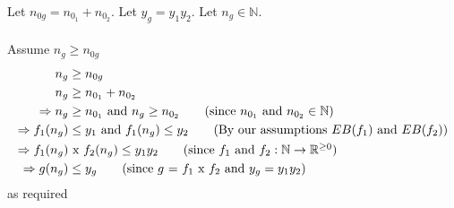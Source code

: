 \documentclass[20pt]{article}
\begin{document}
\begin{enumerate}
        Let $n_{0g} =  n_{0_1} +  n_{0_2}$. Let $y_g =  y_1y_2$.
        Let $n_g \in \mathbb{N}$.\\
        \\
        Assume $n_g \geq n_{0g}$
        \begin{align*}
            n_g &\geq n_{0g} \\
            n_g &\geq n_{0_1} +  n_{0_2} \\
            \Rightarrow n_g &\geq n_{0_1} \text{ and } n_g \geq n_{0_2} 
            \tag{since $n_{0_1}$ and $n_{0_2} \in \mathbb{N}$} \\
            \Rightarrow f_1(n_g) &\leq y_1 \text{ and } f_1(n_g) \leq y_2 \tag{By our assumptions $EB(f_1)$ and $EB(f_2)$}\\
            \Rightarrow  f_1(n_g) &\text{ x }f_2(n_g) \leq y_1y_2 \tag{since $f_1$ and $f_2: \mathbb{N} \to \mathbb{R}^{\geq0}$} \\
            \Rightarrow g(n_g) &\leq y_g \tag{since $g$ = $f_1$ x $f_2$ and $y_g =  y_1y_2$}
        \end{align*}
        as required \hfill \Box
        
    
\end{enumerate}
\end{document}
